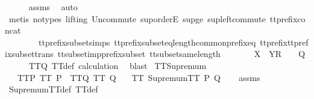 \begin{isabellebody}
\ \ \ \ \isamarkupfalse%
\ {\isasymsigma}{\isacharunderscore}assms\ \isamarkupfalse%
\ auto\isanewline
\ \ \ \ \isamarkupfalse%
\ {\isacharparenleft}metis\ {\isacharparenleft}no{\isacharunderscore}types{\isacharcomma}\ lifting{\isacharparenright}\ Un{\isacharunderscore}commute\ sup{\isachardot}orderE\ sup{\isacharunderscore}ge{}\ sup{\isacharunderscore}left{\isacharunderscore}commute\ tt{\isacharunderscore}prefix{\isacharunderscore}concat\ \isanewline
\ \ \ \ \ \ \ \ tt{\isacharunderscore}prefix{\isacharunderscore}subset{\isachardot}simps{\isacharparenleft}{}{\isacharparenright}\ tt{\isacharunderscore}prefix{\isacharunderscore}subset{\isacharunderscore}eq{\isacharunderscore}length{\isacharunderscore}common{\isacharunderscore}prefix{\isacharunderscore}eq\ tt{\isacharunderscore}prefix{\isacharunderscore}tt{\isacharunderscore}prefix{\isacharunderscore}subset{\isacharunderscore}trans\ tt{\isacharunderscore}subset{\isacharunderscore}imp{\isacharunderscore}prefix{\isacharunderscore}subset\ tt{\isacharunderscore}subset{\isacharunderscore}same{\isacharunderscore}length{\isacharparenright}\isanewline
\ \ \isamarkupfalse%
\ \isamarkupfalse%
\ {\isachardoublequoteopen}{\isasymrho}{\isacharprime}\ {\isacharat}\ {\isacharbrackleft}X\ {\isasymunion}\ Y{\isacharbrackright}\isactrlsub R\ {\isacharhash}\ {\isasymsigma}{\isacharprime}\ {\isasymin}\ Q{\isachardoublequoteclose}\isanewline
\ \ \ \ \isamarkupfalse%
\ TT{}{\isacharunderscore}Q\ TT{}{\isacharunderscore}def\ calculation\ \isamarkupfalse%
\ blast\isanewline
{}\isamarkupfalse%
%
\endisatagproof
{\isafoldproof}%
%
\isadelimproof
\isanewline
%
\endisadelimproof
\isanewline
{}\isamarkupfalse%
\ TT{}{\isacharunderscore}Supremum{\isacharcolon}\isanewline
\ \ \ TT{}{\isacharunderscore}P{\isacharcolon}\ {\isachardoublequoteopen}TT{}\ P{\isachardoublequoteclose}\ \ TT{}{\isacharunderscore}Q{\isacharcolon}\ {\isachardoublequoteopen}TT{}\ Q{\isachardoublequoteclose}\isanewline
\ \ \ {\isachardoublequoteopen}TT{}\ {\isacharparenleft}SupremumTT\ P\ Q{\isacharparenright}{\isachardoublequoteclose}\isanewline
%
\isadelimproof
\ \ %
\endisadelimproof
%
\isatagproof
{}\isamarkupfalse%
\ assms\ \isamarkupfalse%
\ SupremumTT{\isacharunderscore}def\ TT{}{\isacharunderscore}def\ \isamarkupfalse%

\end{isabellebody}
